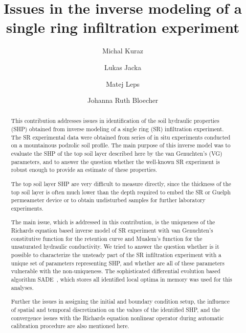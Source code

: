 \documentclass[review]{elsarticle}
\begin{document}
\begin{frontmatter}

\title{Issues in the inverse modeling of a single ring infiltration experiment}

\author[autor1]{Michal Kuraz}

\author[autor1]{Lukas Jacka}

\author[autor2]{Matej Leps}

\author[autor1]{Johanna Ruth Bloecher}

\address[autor1]{Czech University of Life Sciences Prague, Faculty of Environmental Sciences, Department of Water Resources and Environmental Modeling}

\address[autor2]{Czech Technical University in Prague, Faculty of Civil Engineering, Department of Mechanics}

\begin{abstract}
This contribution addresses issues in identification of the soil hydraulic properties (SHP) obtained from inverse modeling of a single ring (SR) infiltration experiment. 
The SR experimental  data  were obtained from series of in situ experiments conducted on a mountainous podzolic soil profile. 
The main purpose of this inverse model was to evaluate the SHP of the top soil layer described here by the van Genuchten's (VG) parameters, and to answer the question whether the well-known SR experiment is robust enough to provide an estimate of these properties.

The top soil layer  SHP are very difficult to measure directly, since the thickness of the top soil layer is often much lower than the depth required to embed the SR or Guelph permeameter device or to obtain  undisturbed samples for further laboratory experiments.


The main issue, which is addressed in this contribution, is the uniqueness of the Richards equation based inverse model of SR experiment with van Genuchten's constitutive function for the retention curve and Mualem's function for the unsaturated hydraulic conductivity. We tried to answer the question whether is it possible to characterize the unsteady part of the SR infiltration experiment with a unique set of parameters representing  SHP, and whether are all of these parameters vulnerable with the non-uniqueness. The sophisticated differential evolution based algorithm SADE~\cite{grade}, which stores all identified local optima in memory was used for this analyses.

Further the issues in assigning the initial and boundary condition setup, the influence of spatial and temporal discretization on the values of the identified SHP, and the convergence issues with the Richards equation nonlinear operator during automatic calibration procedure are also mentioned here.
\end{abstract}


\end{frontmatter}
\end{document}
